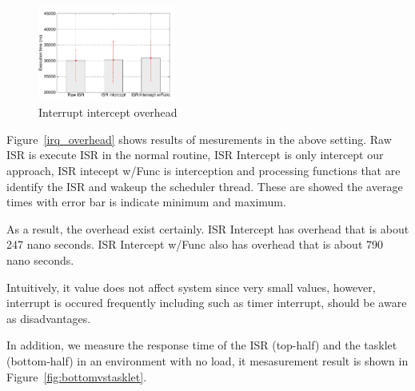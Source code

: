 

\begin{figure}[t]
\begin{center}
\includegraphics[width=0.4\textwidth]{img/interrupt.pdf}
\caption{Interrupt intercept overhead}
\end{center}
\label{fig:irq_overhead}
\end{figure}

Figure~\ref{irq_overhead} shows results of mesurements in the above setting.
Raw ISR is execute ISR in the normal routine, ISR Intercept is only intercept our approach,
ISR intecept w/Func is interception and processing functions that are identify the ISR and wakeup the scheduler thread.
These are showed the average times with error bar is indicate minimum and maximum.

As a result, the overhead exist certainly.
ISR Intercept has overhead that is about 247 nano seconds.
ISR Intercept w/Func also has overhead that is about 790 nano seconds.

Intuitively, it value does not affect system since very small values,
however, interrupt is occured frequently including such as timer interrupt, should be aware as disadvantages.

In addition, we measure the response time of the ISR (top-half) and the tasklet (bottom-half) in an environment with no load, it mesasurement result is shown in Figure~\ref{fig:bottomvstasklet}.



